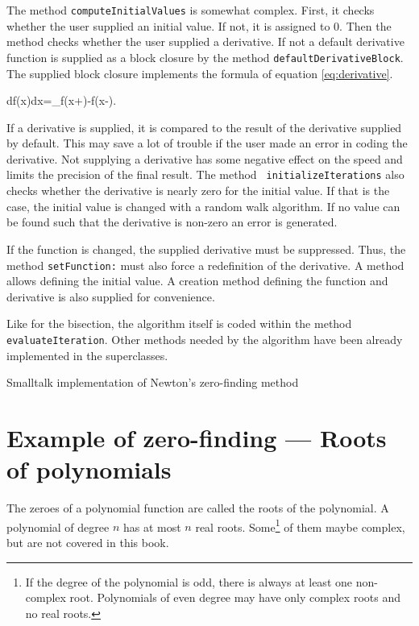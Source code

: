 \documentclass[twoside]{book}
\begin{document}
The method {\tt computeInitialValues} is somewhat complex. First,
it checks whether the user supplied an initial value. If not, it
is assigned to 0. Then the method checks whether the user supplied
a derivative. If not a default derivative function is supplied as
a block closure by the method {\tt defaultDerivativeBlock}. The
supplied block closure implements the formula of equation
\ref{eq:derivative}.

\begin{mainEquation}
\label{eq:derivative} {df\left(x\right)\over dx}=\lim_{\epsilon{}}{f\left(x+\epsilon\right)-f\left(x-\epsilon\right)\epsilon}.
\end{mainEquation}

If a derivative is supplied, it is compared to the result of the
derivative supplied by default. This may save a lot of trouble if
the user made an error in coding the derivative. Not supplying a
derivative has some negative effect on the speed and limits the
precision of the final result. The method {\tt
initializeIterations} also checks whether the derivative is nearly
zero for the initial value. If that is the case, the initial value
is changed with a random walk algorithm. If no value can be found
such that the derivative is non-zero an error is generated.

If the function is changed, the supplied derivative must be
suppressed. Thus, the method {\tt setFunction:} must also force a
redefinition of the derivative. A method allows defining the
initial value. A creation method defining the function and
derivative is also supplied for convenience.

Like for the bisection, the algorithm itself is coded within the
method {\tt evaluateIteration}. Other methods needed by the
algorithm have been already implemented in the superclasses.
\begin{listing} Smalltalk implementation of Newton's zero-finding method \label{ls:newtonZero}

\end{listing}




\section{Example of zero-finding --- Roots of polynomials}
\label{sec:polroots} The zeroes of a polynomial function are
called the roots of the polynomial. A polynomial of degree $n$ has
at most $n$ real roots. Some\footnote{If the degree of the
polynomial is odd, there is always at least one non-complex root.
Polynomials of even degree may have only complex roots and no real
roots.} of them maybe complex, but are not covered in this book.
\end{document}
